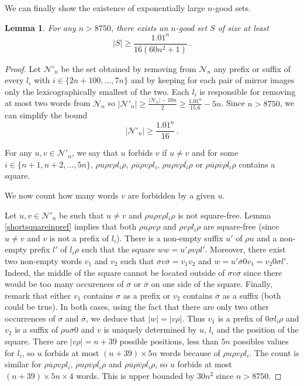 \documentclass[a4paper,12pt]{article}
\newtheorem{lemma}{Lemma}
\newcommand{\pal}{\rho}
\newcommand{\hpal}{\sigma}
\begin{document}
We can finally show the existence of exponentially large $n$-good sets.
\begin{lemma}\label{sizengoodset}
 For any $n>8750$, there exists an $n$-good set $S$ of size at least
  $$|S|\ge\frac{1.01^{n}}{16(60n^2+1)}\,.$$
\end{lemma}
\begin{proof}
Let $\mathcal{N}'_n$ be the set obtained by removing from $\mathcal{N}_n$ any prefix or suffix of
every $l_i$ with  $i\in\{2n+100,\ldots,7n\}$ and by keeping for each pair of mirror images only the lexicographically smallest of the two.
Each $l_i$ is responsible for removing at most two words from $\mathcal{N}_n$ so $|\mathcal{N}'_n|\ge \frac{|\mathcal{N}_n|-10n}{2}\ge\frac{1.01^{n}}{15.6}-5n$. Since $n>8750$, we can simplify the bound $$|\mathcal{N}'_n|\ge\frac{1.01^{n}}{16}\,.$$

For any $u,v\in\mathcal{N}'_n$, we say that $u$ forbids $v$ if $u\not=v$ and for some $i\in\{n+1,n+2,\ldots,5n\}$, $\pal u\pal v\pal l_i\pal$, $\pal\overline{u}\pal v\pal l_i$, $\pal u\pal \overline{ v}\pal \overline{l_i}\pal$ or $\pal\overline{u}\pal\overline{v}\pal\overline{l_i}\pal$ contains a square.

We now count how many words $v$ are forbidden by a given $u$.

Let $u,v\in\mathcal{N}'_n$ be such that $u\not=v$ and  $\pal u\pal v\pal l_i\pal$ is not square-free. 
Lemma \ref{shortsquareinpref} implies that both $\pal u\pal v\pal$ and $\pal v\pal l_i\pal$ are square-free (since $u\not=v$ and $v$ is not a prefix of $l_i$).
There is a non-empty suffix $u'$ of $\pal u$ and a non-empty prefix $l'$ of $l_i\pal$ such that the square $ww= u'\pal v\pal l'$. Moreover, there exist two non-empty words $v_1$ and $v_2$ such that $\hpal v\overline{\hpal}=v_1v_2$ and $w=u'\overline{\hpal} 0 v_1=v_2 0\hpal l'$. Indeed, the middle of the square cannot be located outside of $\hpal v\overline{\hpal}$ since there would be too many occurences of $\hpal$ or $\overline{\hpal}$ on one side of the square.
Finally, remark that either $v_1$ contains $\hpal$ as a prefix or $v_2$ contains $\overline{\hpal}$ as a suffix (both could be true). In both cases, using the fact that there are only two other occurrences of $\hpal$ and $\overline{\hpal}$, we deduce that $|w|=|v\pal |$. Thus $v_1$ is a prefix of $0\hpal l_i\pal$ and $v_2$ is a suffix of $\pal u\overline{\hpal} 0$ and $v$ is uniquely determined by $u$, $l_i$ and the position of the square.
There are $|v\pal |=n+39$ possible positions, less than $5n$ possibles values for $l_i$, so $u$ forbids at most $(n+39)\times 5n$ words because of $\pal u\pal v\pal l_i$. The count is similar for $\pal\overline{u}\pal v\pal l_i$, $\pal u\pal \overline{v}\pal \overline{l_i}\pal$ and $\pal\overline{u}\pal\overline{v}\pal\overline{l_i}\pal$, so  $u$ forbids at most $(n+39)\times 5n\times 4$ words. This is upper bounded by $30n^2$ since $n>8750$.



\end{proof}
\end{document}
